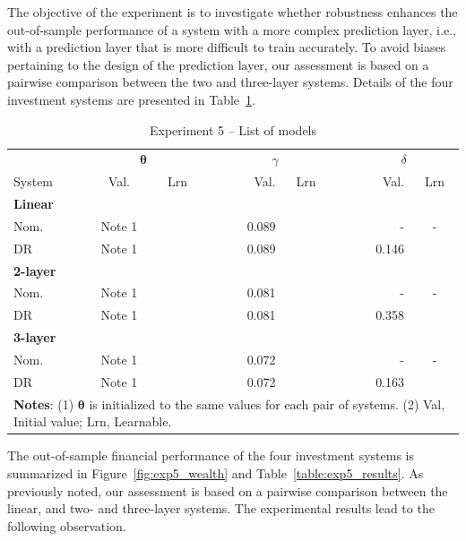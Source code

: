 \documentclass[10pt, twocolumn]{article}
\newcommand{\cmark}{\ding{51}}%
\theoremstyle{plain}
\theoremstyle{definition}
\begin{document}
The objective of the experiment is to investigate whether robustness enhances 
the out-of-sample performance of a system with a more complex prediction 
layer, i.e., with a prediction layer that is more difficult to train accurately. 
To avoid biases pertaining to the design of the prediction layer, our assessment 
is based on a pairwise comparison between the two and three-layer systems. 
Details of the four investment systems are presented in 
Table~\ref{table:exp5_models}.

\begin{table}[t]
\caption{Experiment 5 -- List of models}
\centering
\begin{tabular}{lccr@{}rcr@{}rc}
\toprule
& \multicolumn{2}{c}{\(\bm{\theta}\)} && \multicolumn{2}{c}{\(\gamma\)} && \multicolumn{2}{c}{\(\delta\)}\\[0.5ex] \cline{2-3} \cline{5-6} \cline{8-9}
\rule{0pt}{3ex}System 	& Val. 	& Lrn    && Val. & Lrn 	  && Val. & Lrn \\
\midrule
\multicolumn{2}{l}{\textbf{Linear}}\\[0.5ex]
Nom. & Note 1 & \cmark && 0.089 & \cmark && -     & -      \\[0.5ex]
DR 	 & Note 1 & \cmark && 0.089 & \cmark && 0.146 & \cmark \\[2ex]
\multicolumn{2}{l}{\textbf{2-layer}}\\[0.5ex]
Nom. & Note 1 & \cmark && 0.081 & \cmark && -     & -      \\[0.5ex]
DR 	 & Note 1 & \cmark && 0.081 & \cmark && 0.358 & \cmark \\[2ex]
\multicolumn{2}{l}{\textbf{3-layer}}\\[0.5ex]
Nom. & Note 1 & \cmark && 0.072 & \cmark && -     & -      \\[0.5ex]
DR	 & Note 1 & \cmark && 0.072 & \cmark && 0.163 & \cmark \\[0.25ex]
\bottomrule
\multicolumn{9}{p{0.95\linewidth}}{\small\rule{0pt}{3ex}\textbf{Notes}: (1) \(\bm{\theta}\) is initialized to the same values for each pair of systems. (2) Val, Initial value; Lrn, Learnable.}\\
\end{tabular}
\label{table:exp5_models}
\end{table}

The out-of-sample financial performance of the four investment systems is 
summarized in Figure~\ref{fig:exp5_wealth} and Table~\ref{table:exp5_results}. 
As previously noted, our assessment is based on a pairwise comparison between 
the linear, and two- and three-layer systems. The experimental results 
lead to the following observation.
\end{document}

